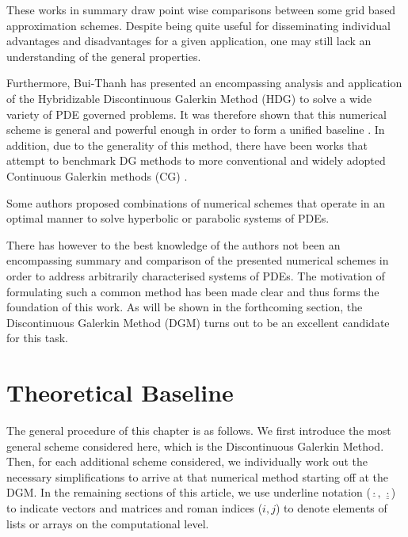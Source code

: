 \documentclass[sn-mathphys,Numbered]{sn-jnl}%
\theoremstyle{thmstyleone}%
\theoremstyle{thmstyletwo}%
\theoremstyle{thmstylethree}%
\begin{document}
These works in summary draw point wise comparisons between some grid based approximation schemes.
Despite being quite useful for disseminating individual advantages and disadvantages for a given application, one may still lack an understanding of the general properties.

Furthermore, Bui-Thanh has presented an encompassing analysis and application of the Hybridizable Discontinuous Galerkin Method (HDG) to solve a wide variety of PDE governed problems.
It was therefore shown that this numerical scheme is general and powerful enough in order to form a unified baseline \cite{bui-thanhGodunovUnifiedHybridized2015}.
In addition, due to the generality of this method, there have been works that attempt to benchmark DG methods to more conventional and widely adopted Continuous Galerkin methods (CG) \cite{yakovlevCGHDGComparative2016a,kronbichlerPerformanceComparisonContinuous2018a,kirbyCGHDGComparative2012}.

Some authors proposed combinations of numerical schemes that operate in an optimal manner to solve hyperbolic \cite{gaburroUnifiedFrameworkSolution2021} or parabolic \cite{yangOptimallyEfficientTechnique2017} systems of PDEs.

There has however to the best knowledge of the authors not been an encompassing summary and comparison of the presented numerical schemes in order to address arbitrarily characterised systems of PDEs.
The motivation of formulating such a common method has been made clear and thus forms the foundation of this work.
As will be shown in the forthcoming section, the Discontinuous Galerkin Method (DGM) turns out to be an excellent candidate for this task.

\section{Theoretical Baseline}\label{sec:baseline}

The general procedure of this chapter is as follows.
We first introduce the most general scheme considered here, which is the Discontinuous Galerkin Method.
Then, for each additional scheme considered, we individually work out the necessary simplifications to arrive at that numerical method starting off at the DGM.
In the remaining sections of this article, we use underline notation ($\underline{\cdot},\,\underline{\underline{\cdot}}$) to indicate vectors and matrices and roman indices ($i,j$) to denote elements of lists or arrays on the computational level.
\end{document}
